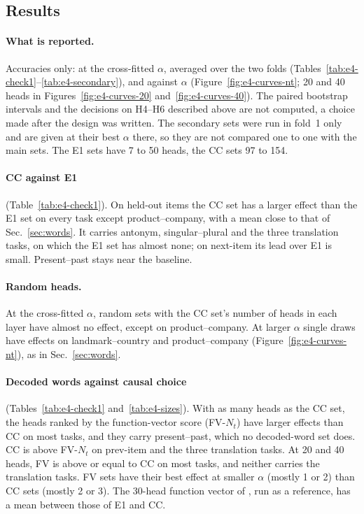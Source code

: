 \documentclass[11pt,a4paper]{article}
\begin{document}
\subsection{Results}\label{sec:res-e4}
\paragraph{What is reported.} Accuracies only: at the cross-fitted $\alpha$, averaged over the two folds (Tables~\ref{tab:e4-check1}--\ref{tab:e4-secondary}), and against $\alpha$ (Figure~\ref{fig:e4-curves-nt}; 20 and 40 heads in Figures~\ref{fig:e4-curves-20} and~\ref{fig:e4-curves-40}). The paired bootstrap intervals and the decisions on H4--H6 described above are not computed, a choice made after the design was written. The secondary sets were run in fold~1 only and are given at their best $\alpha$ there, so they are not compared one to one with the main sets. The E1 sets have 7 to 50 heads, the CC sets 97 to 154.

\paragraph{CC against E1} (Table~\ref{tab:e4-check1}). On held-out items the CC set has a larger effect than the E1 set on every task except product--company, with a mean close to that of Sec.~\ref{sec:words}. It carries antonym, singular--plural and the three translation tasks, on which the E1 set has almost none; on next-item its lead over E1 is small. Present--past stays near the baseline.

\paragraph{Random heads.} At the cross-fitted $\alpha$, random sets with the CC set's number of heads in each layer have almost no effect, except on product--company. At larger $\alpha$ single draws have effects on landmark--country and product--company (Figure~\ref{fig:e4-curves-nt}), as in Sec.~\ref{sec:words}.

\paragraph{Decoded words against causal choice} (Tables~\ref{tab:e4-check1} and~\ref{tab:e4-sizes}). With as many heads as the CC set, the heads ranked by the function-vector score (FV-$N_t$) have larger effects than CC on most tasks, and they carry present--past, which no decoded-word set does. CC is above FV-$N_t$ on prev-item and the three translation tasks. At 20 and 40 heads, FV is above or equal to CC on most tasks, and neither carries the translation tasks. FV sets have their best effect at smaller $\alpha$ (mostly 1 or 2) than CC sets (mostly 2 or 3). The 30-head function vector of \citet{davidson2025different}, run as a reference, has a mean between those of E1 and CC.
\end{document}
